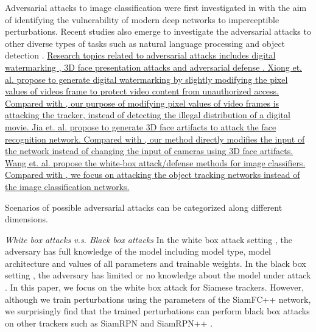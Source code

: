 \documentclass[journal]{IEEEtran}
\begin{document}
Adversarial attacks \cite{9169672} to image classification were first investigated in \cite{intriguing} with the aim of identifying the vulnerability of modern deep networks to imperceptible perturbations. 
Recent studies also emerge to investigate the adversarial attacks to other diverse types of tasks such as natural language processing \cite{generating,zhang2020adversarial,morris2020textattack,jin2020bert} and object detection \cite{wei2019transferable}.
\uline{
Research topics related to adversarial attacks includes digital watermarking \cite{9343885}, 3D face presentation attacks \cite{9294085} and adversarial defense \cite{9169672}.
Xiong et. al. \cite{9343885} propose to generate digital watermarking by slightly modifying the pixel values of videos frame to protect video content from unauthorized access. Compared with \cite{9343885}, our purpose of modifying pixel values of video frames is attacking the tracker, instead of detecting the illegal distribution of a digital movie.
Jia et. al. \cite{9294085} propose to generate 3D face artifacts to attack the face recognition network. Compared with \cite{9294085}, our method directly modifies the input of the network instead of changing the input of cameras using 3D face artifacts.
Wang et. al. \cite{9169672} propose the white-box attack/defense methods for image classifiers. Compared with \cite{9169672}, we focus on attacking the object tracking networks instead of the image classification networks.
}

Scenarios of possible adversarial attacks can be categorized along different dimensions.

\textit{White box attacks v.s. Black box attacks} In the white box attack setting \cite{meng2019white}, the adversary has full knowledge of the model including model type, model architecture and values of all parameters and trainable weights. In the black box setting \cite{cheng2018query,li2019nattack,papernot2017practical,li2020projection}, the adversary has limited or no knowledge about the model under attack \cite{kurakin2018adversarial}. In this paper, we focus on the white box attack for Siamese trackers. However, although we train perturbations using the parameters of the SiamFC++ \cite{SiamFC++} network, we surprisingly find that the trained perturbations can perform black box attacks on other trackers such as SiamRPN \cite{SiamRPN} and SiamRPN++ \cite{SiamRPN++}.
\end{document}
